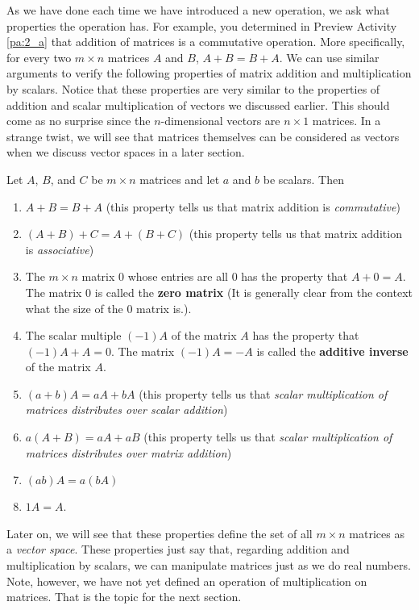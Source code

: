 As we have done each time we have introduced a new operation, we ask what properties the operation has. For example, you determined in Preview Activity \ref{pa:2_a} that addition of matrices is a commutative operation. More specifically, for every two $m\times n$ matrices $A$ and $B$, $A+B=B+A$. We can use similar arguments to verify the following properties of matrix addition and multiplication by scalars. Notice that these properties are very similar to the properties of addition and scalar multiplication of vectors we discussed earlier. This should come as no surprise since the $n$-dimensional vectors are $n\times 1$ matrices. In a strange twist, we will see that matrices themselves can be considered as vectors when we discuss vector spaces in a later section.



\begin{theorem} \label{thm:matrix_sum_properties} Let $A$, $B$, and $C$ be $m \times n$ matrices and let $a$ and $b$ be scalars. Then
\begin{enumerate}
\item $A+B = B+A$ (this property tells us that matrix addition is \emph{commutative})
\item $(A+B) + C = A + (B+C)$ (this property tells us that matrix addition is \emph{associative})
\item The $m \times n$ matrix $0$ whose entries are all 0 has the property that $A + 0 = A$. The matrix $0$ is called the \textbf{zero matrix} (It is generally clear from the context what the size of the 0 matrix is.).
\item  The scalar multiple $(-1)A$ of the matrix $A$ has the property that $(-1)A + A = 0$. The matrix $(-1)A = -A$ is called the \textbf{additive inverse} of the matrix $A$.
\item $(a+b) A = aA + bA$ (this property tells us that \emph{scalar multiplication of matrices distributes over scalar addition})
\item $a(A+B) = aA + aB$ (this property tells us that \emph{scalar multiplication of matrices distributes over matrix addition})
\item $(ab) A = a(bA)$
\item $1A=A$.
\end{enumerate}
\end{theorem}



Later on, we will see that these properties define the set of all $m \times n$ matrices as a \emph{vector space}. These properties just say that, regarding addition and multiplication by scalars, we can manipulate matrices just as we do real numbers. Note, however, we have not yet defined an operation of multiplication on matrices. That is the topic for the next section. 

